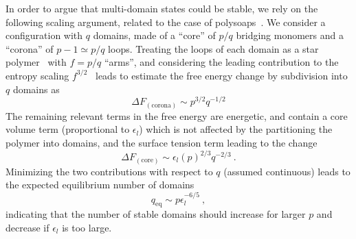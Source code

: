 \documentclass[
preprint,
a4paper,
12pt,
superscriptaddress,
pre]{revtex4}
\begin{document}
In order to argue that multi-domain states could be stable, we rely on
the following scaling argument, related to the case of
polysoaps~\citep{Borisov1997,Borisov1996}. We consider a configuration
with $q$ domains, made of a ``core'' of $p/q$ bridging monomers and a
``corona'' of $p-1\simeq p/q$ loops.  Treating the loops of each
domain as a star polymer~\cite{Borisov1997} with $f=p/q$ ``arms'', and
considering the leading contribution to the entropy scaling
$f^{3/2}$~\cite{Daoud1982} leads to estimate the free energy change by
subdivision into $q$ domains as
\begin{equation}
  \Delta F_\mathrm{(corona)} \sim p^{3/2}q^{-1/2}
 \label{eq:poly1}
\end{equation}
The remaining relevant terms in the free energy are energetic, and
contain a core volume term (proportional to $\epsilon_l$) which is not
affected by the partitioning the polymer into domains, and the surface
tension term leading to the change
\begin{equation}
  \Delta F_{\mathrm{(core)}} \sim \epsilon_l (p)^{2/3}q^{-2/3} \ .
 \label{eq:poly2}
\end{equation}
Minimizing the two contributions with respect to $q$ (assumed
continuous) leads to the expected equilibrium number of domains 
\begin{equation}
  q_{\mathrm{eq}} \sim p  \epsilon_l^{-6/5} \ ,
\end{equation}
indicating that the number of stable domains should increase for
larger $p$ and decrease if $\epsilon_l$ is too large. 
\end{document}
